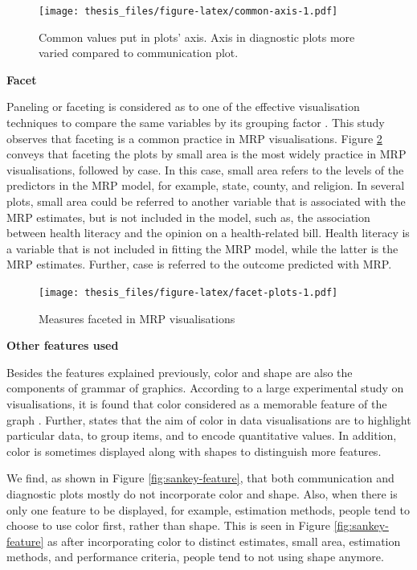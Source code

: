 \documentclass{monashthesis}
\begin{document}
\begin{figure}
\centering
\texttt{[image: thesis\_files/figure-latex/common-axis-1.pdf]}
\caption{\label{fig:common-axis}Common values put in plots' axis. Axis in diagnostic plots more varied compared to communication plot.}
\end{figure}

\textbf{Facet}

Paneling or faceting is considered as to one of the effective visualisation techniques to compare the same variables by its grouping factor \autocite{MIDWAY2020100141}. This study observes that faceting is a common practice in MRP visualisations. Figure \ref{fig:facet-plots} conveys that faceting the plots by small area is the most widely practice in MRP visualisations, followed by case. In this case, small area refers to the levels of the predictors in the MRP model, for example, state, county, and religion. In several plots, small area could be referred to another variable that is associated with the MRP estimates, but is not included in the model, such as, the association between health literacy and the opinion on a health-related bill. Health literacy is a variable that is not included in fitting the MRP model, while the latter is the MRP estimates. Further, case is referred to the outcome predicted with MRP.

\begin{figure}
\centering
\texttt{[image: thesis\_files/figure-latex/facet-plots-1.pdf]}
\caption{\label{fig:facet-plots}Measures faceted in MRP visualisations}
\end{figure}

\textbf{Other features used}

Besides the features explained previously, color and shape are also the components of grammar of graphics. According to a large experimental study on visualisations, it is found that color considered as a memorable feature of the graph \autocite{MIDWAY2020100141}. Further, \textcite{few_2008} states that the aim of color in data visualisations are to highlight particular data, to group items, and to encode quantitative values. In addition, color is sometimes displayed along with shapes to distinguish more features.

We find, as shown in Figure \ref{fig:sankey-feature}, that both communication and diagnostic plots mostly do not incorporate color and shape. Also, when there is only one feature to be displayed, for example, estimation methods, people tend to choose to use color first, rather than shape. This is seen in Figure \ref{fig:sankey-feature} as after incorporating color to distinct estimates, small area, estimation methods, and performance criteria, people tend to not using shape anymore.
\end{document}
